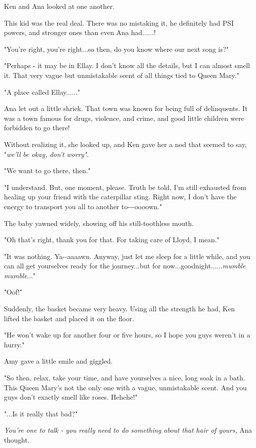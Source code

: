 \documentclass[
]{article}
\begin{document}
Ken and Ana looked at one another.

This kid was the real deal. There was no mistaking it, he definitely had
PSI powers, and stronger ones than even Ana had......!

"You're right, you're right...so then, do you know where our next song
is?"

"Perhaps - it may be in Ellay. I don't know all the details, but I can
almost smell it. That very vague but unmistakable scent of all things
tied to Queen Mary."

"A place called Ellay......"

Ana let out a little shriek. That town was known for being full of
delinquents. It was a town famous for drugs, violence, and crime, and
good little children were forbidden to go there!

Without realizing it, she looked up, and Ken gave her a nod that seemed
to say, "\emph{we'll be okay, don't worry"}.

"We want to go there, then."

"I understand. But, one moment, please. Truth be told, I'm still
exhausted from healing up your friend with the caterpillar sting. Right
now, I don't have the energy to transport you all to another
to-\/-\/-oooown."

The baby yawned widely, showing off his still-toothless mouth.

"Oh that's right, thank you for that. For taking care of Lloyd, I mean."

"It was nothing. Ya-\/-aaaawn. Anyway, just let me sleep for a little
while, and you can all get yourselves ready for the journey...but for
now...goodnight......\emph{mumble mumble}..."

"Oof!"

Suddenly, the basket became very heavy. Using all the strength he had,
Ken lifted the basket and placed it on the floor.

"He won't wake up for another four or five hours, so I hope you guys
weren't in a hurry."

Amy gave a little smile and giggled.

"So then, relax, take your time, and have yourselves a nice, long soak
in a bath. This Queen Mary's not the only one with a vague, unmistakable
scent. And you guys don't exactly smell like roses. Hehehe!"

"...Is it really that bad?"

\emph{You're one to talk - you really need to do something about that
hair of yours, }Ana thought.
\end{document}
